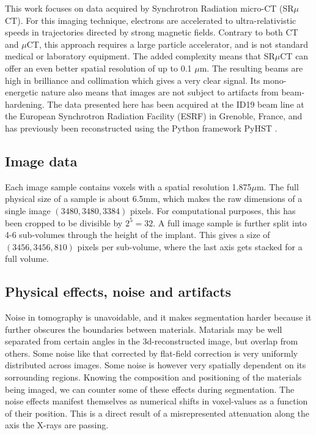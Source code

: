 This work focuses on data acquired by Synchrotron Radiation micro-CT (SR$\mu$CT). For this imaging
technique, electrons are accelerated to ultra-relativistic speeds in trajectories directed by strong
magnetic fields. Contrary to both CT and $\mu$CT, this approach requires a large particle accelerator,
and is not standard medical or laboratory equipment. The added complexity means that SR$\mu$CT can
offer an even better spatial resolution of up to 0.1 $\mu$m. The resulting beams are high in
brilliance and collimation which gives a very clear signal. Its mono-energetic nature also means
that images are not subject to artifacts from beam-hardening. The data presented here has been
acquired at the ID19 beam line at the European Synchrotron Radiation Facility (ESRF) in Grenoble,
France, and has previously  been reconstructed using the Python
framework PyHST \citep{pyhst}.

\subsection{Image data}

Each image sample contains voxels with a spatial resolution 1.875$\mu$m. The full physical size of
a sample is about 6.5mm, which makes the raw dimensions of a single image $(3480,3480,3384)$ pixels.
For computational purposes, this has been cropped to be divisible by $2^5=32$. A full image sample
is further split into 4-6 sub-volumes through the height of the implant. This gives a size of
$(3456,3456,810)$ pixels per sub-volume, where the last axis gets stacked for a full volume.
 

\subsection{Physical effects, noise and artifacts}

Noise in tomography is unavoidable, and it makes segmentation harder because it further obscures
the boundaries between materials. Matarials may be well separated from certain angles in the
3d-reconstructed image, but overlap from others. Some noise like that corrected by flat-field
correction is very uniformly distributed across images. Some noise is however very spatially
dependent on its sorrounding regions. Knowing the composition and positioning of the materials
being imaged, we can counter some of these effects during segmentation. The noise effects manifest
themselves as numerical shifts in voxel-values as a function of their position. This is a direct
result of a misrepresented attenuation along the axis the X-rays are passing.

